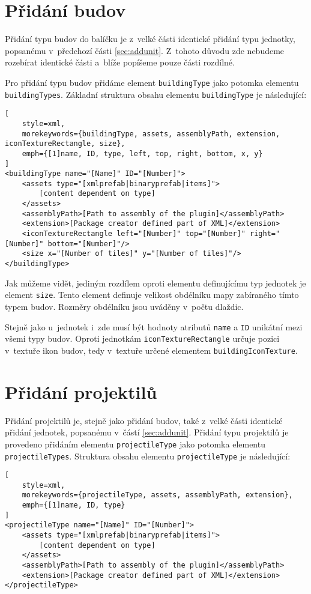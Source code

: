 \section{Přidání budov}
Přidání typu budov do balíčku je z~velké části identické přidání typu jednotky, popsanému v~předchozí části \ref{sec:addunit}. Z~tohoto důvodu zde nebudeme rozebírat identické části a~blíže popíšeme pouze části rozdílné.

Pro přidání typu budov přidáme element \texttt{buildingType} jako potomka elementu \texttt{buildingTypes}. Základní struktura obsahu elementu \texttt{buildingType} je následující:

\begin{lstlisting}[
	style=xml,
	morekeywords={buildingType, assets, assemblyPath, extension, iconTextureRectangle, size},
	emph={[1]name, ID, type, left, top, right, bottom, x, y}
]
<buildingType name="[Name]" ID="[Number]">
	<assets type="[xmlprefab|binaryprefab|items]">
		[content dependent on type]
	</assets>
	<assemblyPath>[Path to assembly of the plugin]</assemblyPath>
	<extension>[Package creator defined part of XML]</extension>
	<iconTextureRectangle left="[Number]" top="[Number]" right="[Number]" bottom="[Number]"/>
	<size x="[Number of tiles]" y="[Number of tiles]"/>
</buildingType>
\end{lstlisting}

Jak můžeme vidět, jediným rozdílem oproti elementu definujícímu typ jednotek je element \texttt{size}. Tento element definuje velikost obdélníku mapy zabíraného tímto typem budov. Rozměry obdélníku jsou uváděny v~počtu dlaždic.

Stejně jako u~jednotek i~zde musí být hodnoty atributů \texttt{name} a \texttt{ID} unikátní mezi všemi typy budov. Oproti jednotkám \texttt{iconTextureRectangle} určuje pozici v~textuře ikon budov, tedy v~textuře určené elementem \texttt{buildingIconTexture}.


\section{Přidání projektilů}
Přidání projektilů je, stejně jako přidání budov, také z~velké části identické přidání jednotek, popsanému v~částí \ref{sec:addunit}. Přidání typu projektilů je provedeno přidáním elementu \texttt{projectileType} jako potomka elementu \texttt{projectileTypes}. Struktura obsahu elementu \texttt{projectileType} je následující:

\begin{lstlisting}[
	style=xml,
	morekeywords={projectileType, assets, assemblyPath, extension},
	emph={[1]name, ID, type}
]
<projectileType name="[Name]" ID="[Number]">
	<assets type="[xmlprefab|binaryprefab|items]">
		[content dependent on type]
	</assets>
	<assemblyPath>[Path to assembly of the plugin]</assemblyPath>
	<extension>[Package creator defined part of XML]</extension>
</projectileType>
\end{lstlisting}

